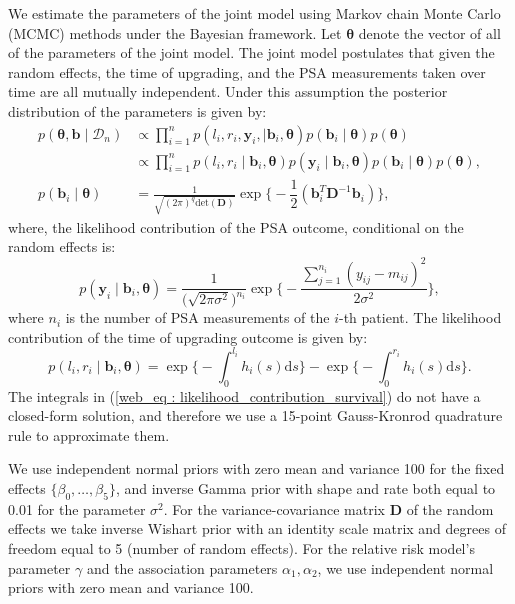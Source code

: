 We estimate the parameters of the joint model using Markov chain Monte Carlo (MCMC) methods under the Bayesian framework. Let $\boldsymbol{\theta}$ denote the vector of all of the parameters of the joint model. The joint model postulates that given the random effects, the time of upgrading, and the PSA measurements taken over time are all mutually independent. Under this assumption the posterior distribution of the parameters is given by:
\begin{align*}
p(\boldsymbol{\theta}, \boldsymbol{b} \mid \mathcal{D}_n) & \propto \prod_{i=1}^n p(l_i, r_i, \boldsymbol{y}_{i}, \mid \boldsymbol{b}_i, \boldsymbol{\theta}) p(\boldsymbol{b}_i \mid \boldsymbol{\theta}) p(\boldsymbol{\theta})\\
& \propto \prod_{i=1}^n p(l_i, r_i \mid \boldsymbol{b}_i, \boldsymbol{\theta}) p(\boldsymbol{y}_{i} \mid \boldsymbol{b}_i, \boldsymbol{\theta}) p(\boldsymbol{b}_i \mid \boldsymbol{\theta}) p(\boldsymbol{\theta}),\\
p(\boldsymbol{b}_i \mid \boldsymbol{\theta}) &= \frac{1}{\sqrt{(2 \pi)^q \text{det}(\boldsymbol{D})}} \exp\bigg\{-\dfrac{1}{2}(\boldsymbol{b}_i^T \boldsymbol{D}^{-1} \boldsymbol{b}_i)\bigg\},
\end{align*}
where, the likelihood contribution of the PSA outcome, conditional on the random effects is:
\begin{equation*}
p(\boldsymbol{y}_{i} \mid \boldsymbol{b}_i, \boldsymbol{\theta}) = \frac{1}{\big(\sqrt{2 \pi \sigma^2}\big)^{n_{i}}} \exp\bigg\{-\frac{\sum_{j=1}^{n_i}{({y}_{ij} - {m}_{ij})}^2}{2\sigma^2}\bigg\},
\end{equation*}
where $n_i$ is the number of PSA measurements of the $i$-th patient. The likelihood contribution of the time of upgrading outcome is given by:
\begin{equation}
\label{web_eq : likelihood_contribution_survival}
p(l_i,r_i\mid \boldsymbol{b}_i,\boldsymbol{\theta}) = \exp\Big\{-\int_0^{l_i} h_i(s)\mathrm{d}{s}\Big\} - \exp\Big\{-\int_0^{r_i}h_i(s)\mathrm{d}{s}\Big\}.
\end{equation}
The integrals in (\ref{web_eq : likelihood_contribution_survival}) do not have a closed-form solution, and therefore we use a 15-point Gauss-Kronrod quadrature rule to approximate them.

We use independent normal priors with zero mean and variance 100 for the fixed effects $\{\beta_{0},\ldots,\beta_{5}\}$, and inverse Gamma prior with shape and rate both equal to 0.01 for the parameter $\sigma^2$. For the variance-covariance matrix $\boldsymbol{D}$ of the random effects we take inverse Wishart prior with an identity scale matrix and degrees of freedom equal to 5 (number of random effects). For the relative risk model's parameter $\gamma$ and the association parameters $\alpha_{1}, \alpha_{2}$, we use independent normal priors with zero mean and variance 100.


